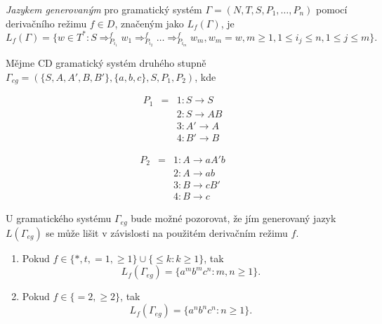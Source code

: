 \begin{definice} \label{defCDJazyk}
  \emph{Jazykem generovaným} pro gramatický systém $\Gamma = (N, T, S, P_1, \dots, P_n)$ pomocí derivačního režimu $f \in D$, značeným jako $L_f(\Gamma)$, je
  $$L_f(\Gamma) = \{w \in T^*\!: S \Rightarrow_{P_{i_1}}^f w_1 \Rightarrow_{P_{i_2}}^f \dots \Rightarrow_{P_{i_m}}^f w_m, w_m = w, m \geq 1, 1 \leq i_j \leq n, 1 \leq j \leq m\}.$$
\end{definice}

\begin{priklad}
  Mějme CD gramatický systém druhého stupně $\Gamma_{eg} = (\{S, A, A', B, B'\}, \{a, b, c\}, S, P_1, P_2)$, kde
  \vspace{-2em}
  \begin{multicols}{2}

    \begin{eqnarray*}
      P_1 & = & 1\!: S \rightarrow S \\
          &   & 2\!: S \rightarrow A B \\
          &   & 3\!: A' \rightarrow A \\
          &   & 4\!: B' \rightarrow B
    \end{eqnarray*}

    \columnbreak

    \begin{eqnarray*}
      P_2 & = & 1\!: A \rightarrow a A' b \\
          &   & 2\!: A \rightarrow a b \\
          &   & 3\!: B \rightarrow c B'\\
          &   & 4\!: B \rightarrow c
    \end{eqnarray*}

    \end{multicols}
    U gramatického systému $\Gamma_{eg}$ bude možné pozorovat, že jím generovaný jazyk $L(\Gamma_{eg})$ se může lišit v závislosti na použitém derivačním režimu $f$.
    \begin{enumerate}
      \item Pokud $f \in \{*, t, =\!1, \geq\!1\} \cup \{\leq\!k\!: k \geq 1\}$, tak
      $$L_f(\Gamma_{eg}) = \{a^mb^mc^n\!: m, n \geq 1 \}.$$


      \item Pokud $f \in \{=\!2, \geq\!2\}$, tak
      $$L_f(\Gamma_{eg}) = \{a^nb^nc^n\!: n \geq 1 \}.$$


\end{enumerate}
\end{priklad}
